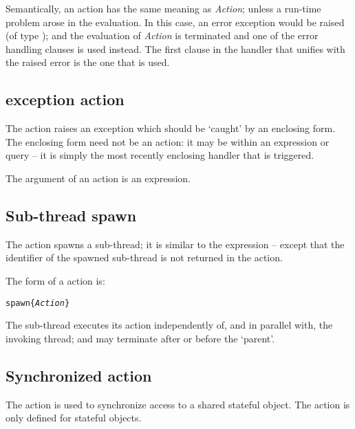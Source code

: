 Semantically, an  action has the same meaning as \emph{Action}; unless a run-time problem arose in the evaluation. In this case, an error exception would be raised (of type ); and the evaluation of \emph{Action} is terminated and one of the error handling clauses is used instead. The first clause in the handler that unifies with the raised error is the one that is used.

\subsection{ exception action}
\label{action:exception}

The  action raises an exception which should be `caught' by an enclosing  form. The enclosing  form need not be an action: it may be within an  expression or query -- it is simply the most recently enclosing  handler that is triggered. 

The argument of an  action is an  expression.

\subsection{Sub-thread spawn}
\label{action:spawn}

The  action spawns a sub-thread; it is similar to the  expression -- except that the  identifier of the spawned sub-thread is not returned in the  action.

The form of a  action is:
\begin{alltt}
spawn \{ \emph{Action} \}
\end{alltt}
The sub-thread executes its action independently of, and in parallel with, the invoking thread; and may terminate after or before the `parent'. 

\subsection{Synchronized action}
\label{action:sync}

The  action is used to synchronize access to a shared stateful object. The  action is only defined for stateful objects.

